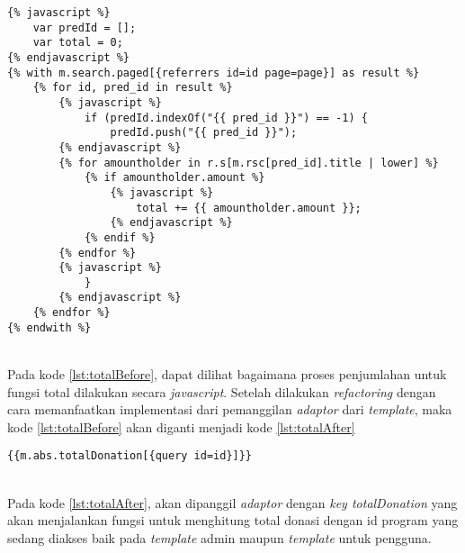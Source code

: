 \begin{minipage}{\linewidth}
\begin{lstlisting}[caption={Fungsi total sebelum refactoring},label={lst:totalBefore}]
{% javascript %}
	var predId = [];
	var total = 0;
{% endjavascript %}
{% with m.search.paged[{referrers id=id page=page}] as result %}
	{% for id, pred_id in result %}
		{% javascript %}
			if (predId.indexOf("{{ pred_id }}") == -1) {
				predId.push("{{ pred_id }}");
		{% endjavascript %}
		{% for amountholder in r.s[m.rsc[pred_id].title | lower] %}
			{% if amountholder.amount %}
				{% javascript %}
					total += {{ amountholder.amount }};
				{% endjavascript %}
			{% endif %}
		{% endfor %}
		{% javascript %}
			}
		{% endjavascript %}
	{% endfor %}
{% endwith %}
\end{lstlisting}
\end{minipage} \\

Pada kode \ref{lst:totalBefore}, dapat dilihat bagaimana proses penjumlahan untuk fungsi total dilakukan secara \textit{javascript}. Setelah dilakukan \textit{refactoring} dengan cara memanfaatkan implementasi dari pemanggilan \textit{adaptor} dari \textit{template}, maka kode \ref{lst:totalBefore} akan diganti menjadi kode \ref{lst:totalAfter}
\begin{minipage}{\linewidth}
\begin{lstlisting}[caption={Fungsi total setelah refactoring}, label={lst:totalAfter}]
{{m.abs.totalDonation[{query id=id}]}}
\end{lstlisting}
\end{minipage} \\

Pada kode \ref{lst:totalAfter}, akan dipanggil \textit{adaptor} dengan \textit{key totalDonation} yang akan menjalankan fungsi untuk menghitung total donasi dengan id program yang sedang diakses baik pada \textit{template} admin maupun \textit{template} untuk pengguna.
